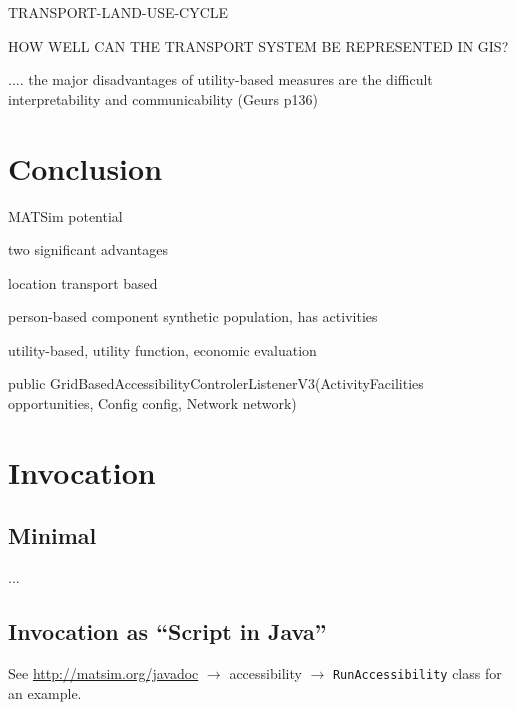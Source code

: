 
TRANSPORT-LAND-USE-CYCLE

HOW WELL CAN THE TRANSPORT SYSTEM BE REPRESENTED IN GIS?

.... the major disadvantages of utility-based measures are the difficult interpretability and communicability (Geurs p136)



\section{Conclusion}

MATSim potential

two significant advantages

location transport based

person-based component synthetic population, has activities

utility-based, utility function, economic evaluation




public GridBasedAccessibilityControlerListenerV3(ActivityFacilities opportunities, Config config, Network network)

\section{Invocation}

\subsection{Minimal}

...



\subsection{Invocation as ``Script in Java''}

See \url{http://matsim.org/javadoc} $\to$ accessibility $\to$ \lstinline{RunAccessibility} class for an example.




